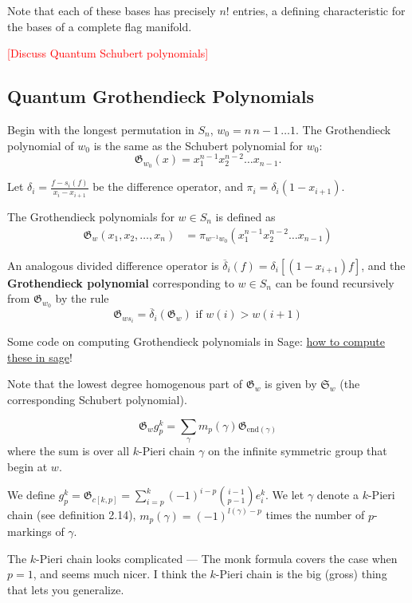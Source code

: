Note that each of these bases has precisely $n!$ entries, a defining characteristic for the bases of a complete flag manifold.

\textcolor{red}{[Discuss Quantum Schubert polynomials]}

\subsection{Quantum Grothendieck Polynomials}

Begin with the longest permutation in $S_n$, $w_0 = n \, n-1 \, \dots 1$. The Grothendieck polynomial of $w_0$ is the same as the Schubert polynomial for $w_0$:
\[
    \mathfrak{G}_{w_0}(x) = x_1^{n-1} x_2^{n-2} \dots x_{n-1}.
\]
\begin{definition}
Let $\delta_i = \frac{f - s_i(f)}{x_i - x_{i+1}}$ be the difference operator, and $\pi_i = \delta_i(1-x_{i+1})$. 

The Grothendieck polynomials for $w \in S_n$ is defined as
\begin{align*}
    \mathfrak{G}_w(x_1, x_2, \ldots, x_n) &= \pi_{w^{-1}w_0}(x_1^{n-1} x_2^{n-2} \ldots x_{n-1}) 
\end{align*}
\end{definition}

\begin{definition}
An analogous divided difference operator is
$\overline{\delta}_i(f) = \delta_i[(1-x_{i+1})f]$, and the \textbf{Grothendieck polynomial} corresponding to $w \in S_n$ can be found recursively from $\mathfrak{G}_{w_0}$ by the rule
\[
    \mathfrak{G}_{ws_i} = \overline{\delta}_i(\mathfrak{G}_w) \text{ if $w(i) > w(i+1)$}
\]
\end{definition}

Some code on computing Grothendieck polynomials in Sage: \href{https://wiki.sagemath.org/combinat/MultivariatePolynomials}{how to compute these in sage}!

Note that the lowest degree homogenous part of $\mathfrak{G}_w$ is given by $\mathfrak{S}_w$ (the corresponding Schubert polynomial). 

\begin{theorem}
    \begin{equation*}
        \mathfrak{G}_wg_p^k = \sum_\gamma m_p(\gamma) \mathfrak{G}_{\text{end}(\gamma)}
    \end{equation*} 
    where the sum is over all $k$-Pieri chain $\gamma$ on the infinite symmetric group that begin at $w$.

    We define $g_p^k = \mathfrak{G}_{c[k,p]} = \sum_{i=p}^k (-1)^{i-p} {{i-1}\choose{p-1}} e_i^k$. We let $\gamma$ denote a $k$-Pieri chain (see definition 2.14), $m_p(\gamma) = (-1)^{l(\gamma) -p}$ times the number of $p$-markings of $\gamma$.
\end{theorem}
The $k$-Pieri chain looks complicated — The monk formula covers the case when $p = 1$, and seems much nicer. I think the $k$-Pieri chain is the big (gross) thing that lets you generalize.

